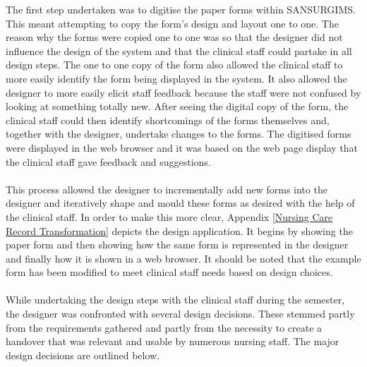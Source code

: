 \noindent The first step undertaken was to digitise the paper forms within SANSURGIMS. This meant attempting to copy the form's design and layout one to one. The reason why the forms were copied one to one was so that the designer did not influence the design of the system and that the clinical staff could partake in all design steps. The one to one copy of the form also allowed the clinical staff to more easily identify the form being displayed in the system. It also allowed the designer to more easily elicit staff feedback because the staff were not confused by looking at something totally new. After seeing the digital copy of the form, the clinical staff could then identify shortcomings of the forms themselves and, together with the designer, undertake changes to the forms. The digitised forms were displayed in the web browser and it was based on the web page display that the clinical staff gave feedback and suggestions. 
\\ \\
This process allowed the designer to incrementally add new forms into the designer and iteratively shape and mould these forms as desired with the help of the clinical staff. In order to make this more clear, Appendix \ref{Nursing Care Record Transformation} depicts the design application. It begins by showing the paper form and then showing how the same form is represented in the designer and finally how it is shown in a web browser. It should be noted that the example form has been modified to meet clinical staff needs based on design choices.
\\ \\ 
While undertaking the design steps with the clinical staff during the semester, the designer was confronted with several design decisions. These stemmed partly from the requirements gathered and partly from the necessity to create a handover that was relevant and usable by numerous nursing staff. The major design decisions are outlined below.

